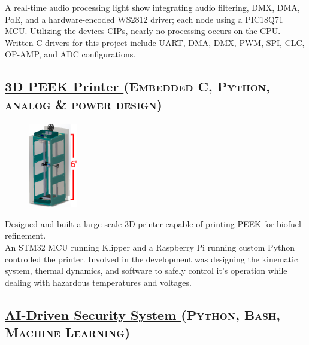 \documentclass[
	10pt, %
]{FreemanCV}
\begin{document}
\begin{paracol}{2}
A real-time audio processing light show integrating audio filtering, DMX, DMA, PoE, and a hardware-encoded WS2812 driver; each node using a PIC18Q71 MCU. Utilizing the devices CIPs, nearly no processing occurs on the CPU.\\

Written C drivers for this project include UART, DMA, DMX, PWM, SPI, CLC, OP-AMP, and ADC configurations.

\switchcolumn

\vspace*{-10pt}
\leavevmode \subsection{\href{https://github.com/jfcbooth/3dpp}{3D PEEK Printer \linkcolor\scriptsize\faLink}
\hfill
\textsc{\footnotesize{(Embedded C, Python, analog \& power design)}}}

\setlength\intextsep{-5pt} %
\begin{figure} %
	\hspace*{-5pt} %
    \includegraphics[width=60pt]{printer} %
\end{figure}

Designed and built a large-scale 3D printer capable of printing PEEK for biofuel refinement.\\

An STM32 MCU running Klipper and a Raspberry Pi running custom Python controlled the printer.
Involved in the development was designing the kinematic system, thermal dynamics, and software to safely control it's operation
while dealing with hazardous temperatures and voltages.


\vspace*{0pt}
\leavevmode \subsection{\href{https://github.com/jfcbooth/security_system}{AI-Driven Security System \linkcolor\scriptsize\faLink}
\hfill
\textsc{\footnotesize{(Python, Bash, Machine Learning)}}}


\end{paracol}
\end{document}
